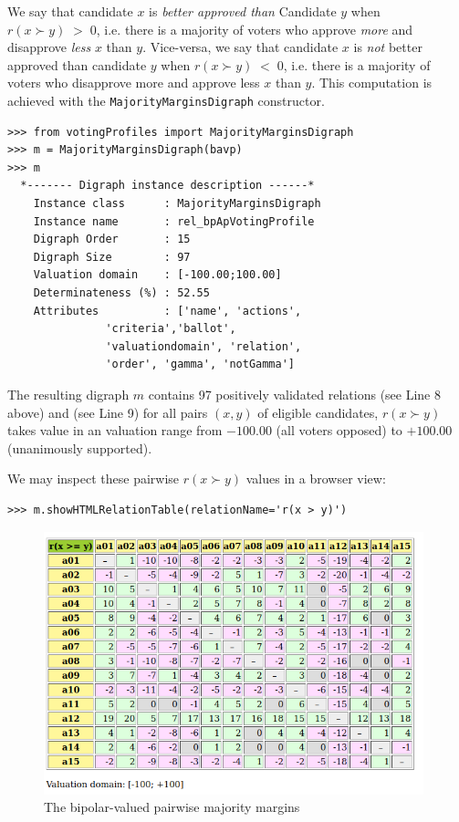 We say that candidate $x$ is \emph{better approved than} Candidate $y$ when $r(x \succ y)\;>\;0$, i.e. there is a majority of voters who approve \emph{more} and disapprove \emph{less} $x$ than $y$. Vice-versa, we say that candidate $x$ is \emph{not} better approved than candidate $y$ when $r(x \succ y)\;<\;0$, i.e. there is a majority of voters who disapprove more and approve less $x$ than $y$. This computation is achieved with the \texttt{MajorityMarginsDigraph} constructor.
\begin{lstlisting}
>>> from votingProfiles import MajorityMarginsDigraph
>>> m = MajorityMarginsDigraph(bavp)
>>> m
  *------- Digraph instance description ------*
    Instance class      : MajorityMarginsDigraph
    Instance name       : rel_bpApVotingProfile
    Digraph Order       : 15
    Digraph Size        : 97
    Valuation domain    : [-100.00;100.00]
    Determinateness (%) : 52.55
    Attributes          : ['name', 'actions',
               'criteria','ballot',
               'valuationdomain', 'relation',
               'order', 'gamma', 'notGamma']
\end{lstlisting}
The resulting digraph $m$ contains 97 positively validated relations (see Line 8 above) and (see Line 9) for all pairs $(x,y)$ of eligible candidates, $r(x \succ y)$ takes value in an valuation range from $-100.00$ (all voters opposed) to $+100.00$ (unanimously supported).

We may inspect these pairwise $r(x \succ y)$ values in a browser view: 
\begin{lstlisting}
>>> m.showHTMLRelationTable(relationName='r(x > y)')
\end{lstlisting}
\begin{figure}[h]
\includegraphics[width=11cm]{Figures/majMargAV.png}
\caption{The bipolar-valued pairwise majority margins} 
\label{fig:21.1}       %
\end{figure}


